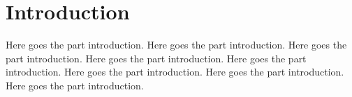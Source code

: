 \chapter{Introduction}

Here goes the part introduction.
Here goes the part introduction.
Here goes the part introduction.
Here goes the part introduction.
Here goes the part introduction.
Here goes the part introduction.
Here goes the part introduction.
Here goes the part introduction.


